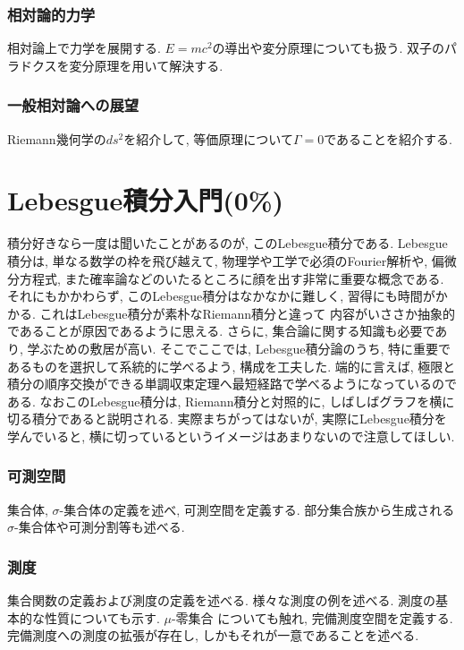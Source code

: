 \documentclass[a4j,dvipdfmx]{jsarticle}
\numberwithin{equation}{section}
\begin{document}
    \section{相対論的力学}
        相対論上で力学を展開する. $E=mc^2$の導出や変分原理についても扱う. 双子のパラドクスを変分原理を用いて解決する.
    \clearpage
    \section{一般相対論への展望}
        Riemann幾何学の$ds^2$を紹介して, 等価原理について$\Gamma=0$であることを紹介する.
    \clearpage

    \part{Lebesgue積分入門(0\%)}
    \begin{screen}
        積分好きなら一度は聞いたことがあるのが, このLebesgue積分である. Lebesgue積分は, 単なる数学の枠を飛び越えて, 
        物理学や工学で必須のFourier解析や, 偏微分方程式, また確率論などのいたるところに顔を出す非常に重要な概念である.
        それにもかかわらず, このLebesgue積分はなかなかに難しく, 習得にも時間がかかる. これはLebesgue積分が素朴なRiemann積分と違って
        内容がいささか抽象的であることが原因であるように思える. さらに, 集合論に関する知識も必要であり, 学ぶための敷居が高い.
        そこでここでは, Lebesgue積分論のうち, 特に重要であるものを選択して系統的に学べるよう, 構成を工夫した. 
        端的に言えば, 極限と積分の順序交換ができる単調収束定理へ最短経路で学べるようになっているのである.
        なおこのLebesgue積分は, Riemann積分と対照的に, しばしばグラフを横に切る積分であると説明される. 実際まちがってはないが, 
        実際にLebesgue積分を学んでいると, 横に切っているというイメージはあまりないので注意してほしい.
    \end{screen}
    \clearpage
    \section{可測空間}
        集合体, $\sigma$-集合体の定義を述べ, 可測空間を定義する. 部分集合族から生成される$\sigma$-集合体や可測分割等も述べる.
    \clearpage
    \section{測度}
        集合関数の定義および測度の定義を述べる. 様々な測度の例を述べる. 測度の基本的な性質についても示す. $\mu$-零集合
        についても触れ, 完備測度空間を定義する. 完備測度への測度の拡張が存在し, しかもそれが一意であることを述べる.
    \clearpage
\end{document}

